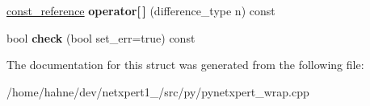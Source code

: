 \begin{DoxyCompactItemize}
\item 
\hyperlink{structswig_1_1SwigPySequence__Ref}{const\+\_\+reference} {\bfseries operator\mbox{[}$\,$\mbox{]}} (difference\+\_\+type n) const \hypertarget{structswig_1_1SwigPySequence__Cont_a3e1b9772330900a6e8e8fd4e1d537701}{}\label{structswig_1_1SwigPySequence__Cont_a3e1b9772330900a6e8e8fd4e1d537701}

\item 
bool {\bfseries check} (bool set\+\_\+err=true) const \hypertarget{structswig_1_1SwigPySequence__Cont_aaa5708e07cf027475b8641c2f2eefea2}{}\label{structswig_1_1SwigPySequence__Cont_aaa5708e07cf027475b8641c2f2eefea2}

\end{DoxyCompactItemize}


The documentation for this struct was generated from the following file\+:\begin{DoxyCompactItemize}
\item 
/home/hahne/dev/netxpert1\+\_/src/py/pynetxpert\+\_\+wrap.\+cpp\end{DoxyCompactItemize}
